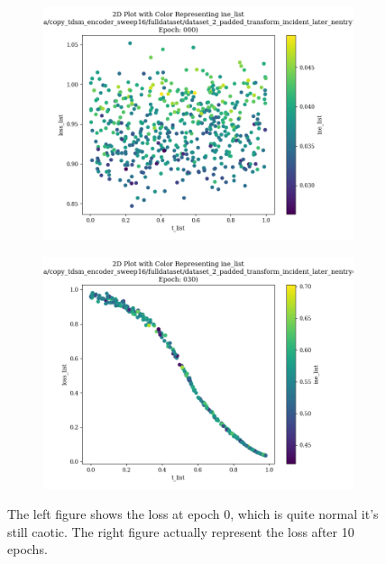 \begin{figure}[htbp]
    \centering
    \begin{subfigure}[b]{0.45\textwidth} %
        \includegraphics[width=\textwidth]{Figures/loss_t_0.png}
        \caption{}
        \label{fig:loss_t_0}
    \end{subfigure}
    \hfill %
    \begin{subfigure}[b]{0.45\textwidth}
        \includegraphics[width=\textwidth]{Figures/loss_t_10.png}
        \caption{}
        \label{fig:loss_t_10}
    \end{subfigure}
    
    \caption{The left figure shows the loss at epoch 0, which is quite normal it's still caotic. The right figure actually represent the loss after 10 epochs.}
    \label{fig:loss_t}
\end{figure}

